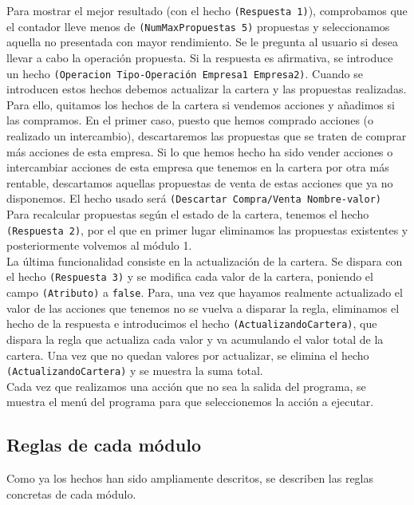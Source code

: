 \documentclass[11pt,leqno]{article}
\theoremstyle{definition_wo_parentheses}
\theoremstyle{plain}
\theoremstyle{remark}
\begin{document}
Para mostrar el mejor resultado (con el hecho \texttt{(Respuesta 1)}), comprobamos que el contador lleve menos de \texttt{(NumMaxPropuestas 5)} propuestas y seleccionamos aquella no presentada con mayor rendimiento. Se le pregunta al usuario si desea llevar a cabo la operación propuesta. Si la respuesta es afirmativa, se introduce un hecho \texttt{(Operacion Tipo-Operación Empresa1 Empresa2)}. Cuando se introducen estos hechos debemos actualizar la cartera y las propuestas realizadas. Para ello, quitamos los hechos de la cartera si vendemos acciones y añadimos si las compramos. En el primer caso, puesto que hemos comprado acciones (o realizado un intercambio), descartaremos las propuestas que se traten de comprar más acciones de esta empresa. Si lo que hemos hecho ha sido vender acciones o intercambiar acciones de esta empresa que tenemos en la cartera por otra más rentable, descartamos aquellas propuestas de venta de estas acciones que ya no disponemos. El hecho usado será \texttt{(Descartar Compra/Venta Nombre-valor)}\\

Para recalcular propuestas según el estado de la cartera, tenemos el hecho \texttt{(Respuesta 2)}, por el que en primer lugar eliminamos las propuestas existentes y posteriormente volvemos al módulo 1.\\

La última funcionalidad consiste en la actualización de la cartera. Se dispara con el hecho \texttt{(Respuesta 3)} y se modifica cada valor de la cartera, poniendo el campo \texttt{(Atributo)} a \texttt{false}. Para, una vez que hayamos realmente actualizado el valor de las acciones que tenemos no se vuelva a disparar la regla, eliminamos el hecho de la respuesta e introducimos el hecho \texttt{(ActualizandoCartera)}, que dispara la regla que actualiza cada valor y va acumulando el valor total de la cartera. Una vez que no quedan valores por actualizar, se elimina el hecho \texttt{(ActualizandoCartera)} y se muestra la suma total.\\

Cada vez que realizamos una acción que no sea la salida del programa, se muestra el menú del programa para que seleccionemos la acción a ejecutar.

\subsection{Reglas de cada módulo}

	Como ya los hechos han sido ampliamente descritos, se describen las reglas concretas de cada módulo.
	
\end{document}
